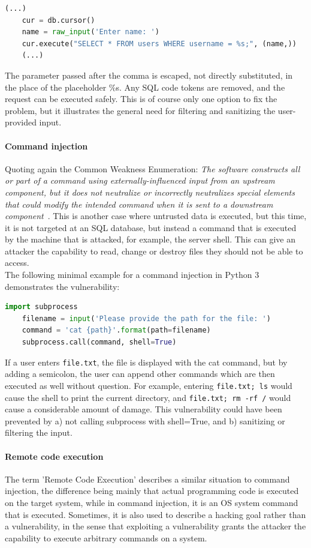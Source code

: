\documentclass[
a4paper,
pagesize,
pdftex,
12pt,
twoside, %
BCOR=5mm, %
ngerman,
fleqn,
final,
]{scrartcl}
\begin{document}
	\begin{lstlisting}[language=Python,showstringspaces=false]
	(...)
	cur = db.cursor()
	name = raw_input('Enter name: ')
	cur.execute("SELECT * FROM users WHERE username = %s;", (name,))
	(...)
	\end{lstlisting}
	The parameter passed after the comma is escaped, not directly substituted, in the place of the placeholder \%s. Any SQL code tokens are removed, and the request can be executed safely. This is of course only one option to fix the problem, but it illustrates the general need for filtering and sanitizing the user-provided input. 
	
	\paragraph{Command injection}
	Quoting again the Common Weakness Enumeration: \textit{The software constructs all or part of a command using externally-influenced input from an upstream component, but it does not neutralize or incorrectly neutralizes special elements that could modify the intended command when it is sent to a downstream component}~\cite{CommonWeaknessEnumeration.23.9.2019}. This is another case where untrusted data is executed, but this time, it is not targeted at an SQL database, but instead a command that is executed by the machine that is attacked, for example, the server shell. This can give an attacker the capability to read, change or destroy files they should not be able to access. \\
	The following minimal example for a command injection in Python 3 demonstrates the vulnerability:
	\begin{lstlisting}[language=Python,showstringspaces=false]
	import subprocess
	filename = input('Please provide the path for the file: ')
	command = 'cat {path}'.format(path=filename)
	subprocess.call(command, shell=True)
	\end{lstlisting}
	If a user enters \texttt{file.txt}, the file is displayed with the cat command, but by adding a semicolon, the user can append other commands which are then executed as well without question. For example, entering \texttt{file.txt; ls} would cause the shell to print the current directory, and \texttt{file.txt; rm -rf /} would cause a considerable amount of damage. This vulnerability could have been prevented by a) not calling subprocess with shell=True, and b) sanitizing or filtering the input. 
	
	\paragraph{Remote code execution}
	The term 'Remote Code Execution' describes a similar situation to command injection, the difference being mainly that actual programming code is executed on the target system, while in command injection, it is an OS system command that is executed. Sometimes, it is also used to describe a hacking goal rather than a vulnerability, in the sense that exploiting a vulnerability grants the attacker the capability to execute arbitrary commands on a system. 
	
\end{document}
